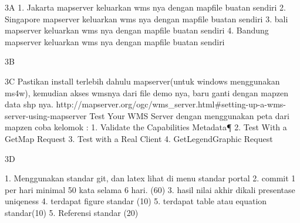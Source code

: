 3A
1. Jakarta mapserver keluarkan wms nya dengan mapfile buatan sendiri
2. Singapore mapserver keluarkan wms nya dengan mapfile buatan sendiri
3. bali mapserver keluarkan wms nya dengan mapfile buatan sendiri
4. Bandung mapserver keluarkan wms nya dengan mapfile buatan sendiri

3B



3C
Pastikan install terlebih dahulu mapserver(untuk windows menggunakan ms4w), 
kemudian akses wmsnya dari file demo nya, baru ganti dengan mapzen data shp nya.
http://mapserver.org/ogc/wms_server.html#setting-up-a-wms-server-using-mapserver
Test Your WMS Server dengan menggunakan peta dari mapzen coba
kelomok :
1. Validate the Capabilities Metadata¶
2. Test With a GetMap Request
3. Test with a Real Client
4. GetLegendGraphic Request

3D




1. Menggunakan standar git, dan latex lihat di menu standar portal
2. commit 1 per hari minimal 50 kata selama 6 hari. (60)
3. hasil nilai akhir dikali presentase uniqeness
4. terdapat figure standar (10)
5. terdapat table atau equation standar(10)
5. Referensi standar (20)